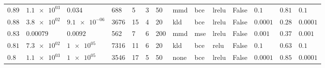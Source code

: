 \begin{landscape}
\begin{table}
\begin{tabular}{llllllllllllll}
$\num{ 0.89 }$ & $\num{ 1.1e+03 }$ &   $\num{ 0.034 }$ &          688 &              5 &        3 &               50 &         mmd &                 bce &               lrelu &     False &    $\num{ 0.1 }$ & $\num{ 0.81 }$ &    $\num{ 0.1 }$ \\
$\num{ 0.88 }$ & $\num{ 3.8e+02 }$ & $\num{ 9.1e-06 }$ &         3676 &             15 &        4 &               20 &         kld &                 bce &               lrelu &     False & $\num{ 0.0001 }$ & $\num{ 0.28 }$ & $\num{ 0.0001 }$ \\
$\num{ 0.83 }$ & $\num{ 0.00079 }$ &  $\num{ 0.0092 }$ &          562 &              7 &        6 &              200 &         mmd &                 mse &               lrelu &     False &  $\num{ 0.001 }$ & $\num{ 0.37 }$ &  $\num{ 0.001 }$ \\
$\num{ 0.81 }$ & $\num{ 7.3e+02 }$ &   $\num{ 1e+05 }$ &         7316 &             11 &        6 &               20 &         kld &                 bce &                relu &     False &    $\num{ 0.1 }$ & $\num{ 0.63 }$ &    $\num{ 0.1 }$ \\
 $\num{ 0.8 }$ & $\num{ 1.1e+03 }$ &   $\num{ 1e+05 }$ &         3546 &             17 &        5 &               50 &        none &                 bce &               lrelu &     False & $\num{ 0.0001 }$ & $\num{ 0.85 }$ & $\num{ 0.0001 }$ \\
\bottomrule
\end{tabular}


\end{table}
\end{landscape}

\clearpage
{}